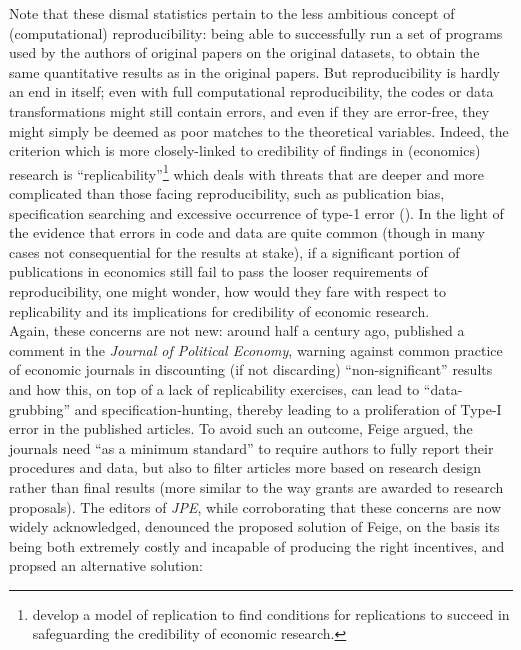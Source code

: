 \documentclass[11pt]{article}
\begin{document}
Note that these dismal statistics pertain to the less ambitious concept of (computational) reproducibility: being able to successfully run a set of programs used by the authors of original papers on the original datasets, to obtain the same quantitative results as in the original papers. But reproducibility is hardly an end in itself; even with full computational reproducibility, the codes or data transformations might still contain errors, and even if they are error-free, they might simply be deemed as poor matches to the theoretical variables. Indeed, the criterion which is more closely-linked to credibility of findings in (economics) research is ``replicability''\footnote{\cite{maniadis2017replicate} develop a model of replication to find conditions for replications to succeed in safeguarding the credibility of economic research.} which deals with threats that are deeper and more complicated than those facing reproducibility, such as publication bias, specification searching and excessive occurrence of type-1 error (\cite{christensen2018transparency}). In the light of the evidence that errors in code and data are quite common (though in many cases not consequential for the results at stake), if a significant portion of publications in economics still fail to pass the looser requirements of reproducibility, one might wonder, how would they fare with respect to replicability and its implications for credibility of economic research.\\

Again, these concerns are not new: around half a century ago, \cite{feige1975consequences} published a comment in the \textit{Journal of Political Economy}, warning against common practice of economic journals in discounting (if not discarding) ``non-significant'' results and how this, on top of a lack of replicability exercises, can lead to ``data-grubbing'' and specification-hunting, thereby leading to a proliferation of Type-I error in the published articles. To avoid such an outcome, Feige argued, the journals need ``as a minimum standard'' to require authors to fully report their procedures and data, but also to filter articles more based on research design rather than final results (more similar to the way grants are awarded to research proposals). The editors of \textit{JPE}, while corroborating that these concerns are now widely acknowledged, denounced the proposed solution of Feige, on the basis its being both extremely costly and incapable of producing the right incentives, and propsed an alternative solution:
\end{document}
